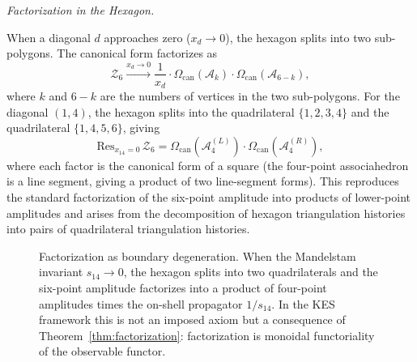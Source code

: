 \documentclass[11pt]{article}
\theoremstyle{plain}
\theoremstyle{definition}
\theoremstyle{remark}
\newcommand{\CF}{\Omega_{\mathrm{can}}}
\begin{document}
\medskip\noindent\textit{Factorization in the Hexagon.}

When a diagonal $d$ approaches zero ($x_d \to 0$), the hexagon splits into two sub-polygons. The canonical form factorizes as
\[
  \mathcal{Z}_6 \xrightarrow{x_d \to 0} \frac{1}{x_d} \cdot \CF(\mathcal{A}_{k}) \cdot \CF(\mathcal{A}_{6-k}),
\]
where $k$ and $6-k$ are the numbers of vertices in the two sub-polygons. For the diagonal $(1,4)$, the hexagon splits into the quadrilateral $\{1,2,3,4\}$ and the quadrilateral $\{1,4,5,6\}$, giving
\[
  \mathrm{Res}_{x_{14}=0}\,\mathcal{Z}_6 = \CF(\mathcal{A}_4^{(L)}) \cdot \CF(\mathcal{A}_4^{(R)}),
\]
where each factor is the canonical form of a square (the four-point associahedron is a line segment, giving a product of two line-segment forms). This reproduces the standard factorization of the six-point amplitude into products of lower-point amplitudes and arises from the decomposition of hexagon triangulation histories into pairs of quadrilateral triangulation histories.


\begin{figure}[H]
\centering
{}
\caption{Factorization as boundary degeneration. When the Mandelstam
invariant $s_{14}\to 0$, the hexagon splits into two quadrilaterals and
the six-point amplitude factorizes into a product of four-point amplitudes
times the on-shell propagator $1/s_{14}$. In the KES framework this is
not an imposed axiom but a consequence of Theorem~\ref{thm:factorization}:
factorization is monoidal functoriality of the observable functor.}
\end{figure}
\end{document}
